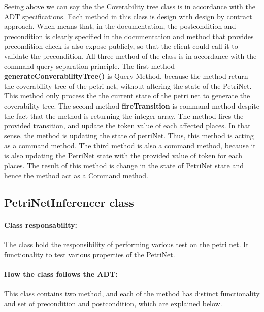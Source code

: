 Seeing above we can say the the Coverability tree class is in accordance with the ADT specifications. Each method in this class is  design with design by contract approach. When means that, in the documentation, the postcondition and precondition is clearly specified in the documentation and method that provides precondition check is also expose publicly, so that the client could call it to validate the precondition. All three method of the class is in accordance with the command query separation principle. The first method  {\bf{generateConverabilityTree()}}  is  Query Method, because the method return the coverability tree of the petri net, without altering the state of the PetriNet. This method only process the the current state  of the petri net  to generate the coverability tree. The second method  {\bf{fireTransition}} is command method despite the fact that the method is returning the integer array. The method fires the provided transition, and update the token value of each affected places. In that sense, the method is updating the state of petriNet. Thus, this method is acting as a command method. The third method is also a command method, because it is also updating  the PetriNet state with the provided value of token for each places.  The result of this method is change in the state of PetriNet state and hence the method act as a Command method.


\subsection{PetriNetInferencer class}

\paragraph*{Class responsability: } The class hold the responsibility of performing various test on the petri net. It functionality to test  various properties of the PetriNet.

\paragraph*{How the class follows the ADT: } This class contains two method, and each of the method has distinct functionality and set of precondition and postcondition, which are explained below.




